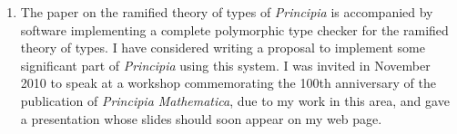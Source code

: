 \begin{description}
\begin{enumerate}
\item The paper on the ramified theory of types of {\em Principia\/}
is accompanied by software implementing a complete polymorphic type
checker for the ramified theory of types.  I have considered writing a
proposal to implement some significant part of {\em Principia\/} using
this system.  I was invited in November 2010 to speak at a workshop
commemorating the 100th anniversary of the publication of {\em
Principia Mathematica\/}, due to my work in this area, and gave a
presentation whose slides should soon appear on my web page.

\end{enumerate}

\end{description}





















